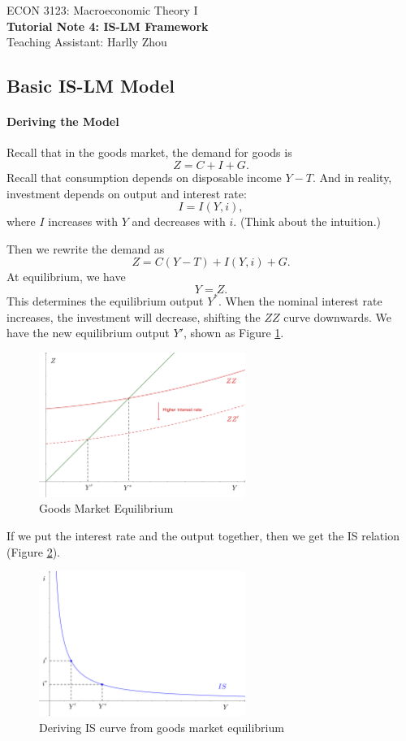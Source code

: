 \documentclass[12pt]{article}
\begin{document}
\begin{center}
    ECON 3123: Macroeconomic Theory I\\
    {\large \textbf{Tutorial Note 4: IS-LM Framework}}\\
    Teaching Assistant: Harlly Zhou
\end{center}

\subsection*{Basic IS-LM Model}
\paragraph{Deriving the Model}
Recall that in the goods market, the demand for goods is
\[ Z = C + I + G. \]
Recall that consumption depends on disposable income $Y-T$. And in reality, investment depends on output and interest rate:
\[ I = I (Y,i),\]
where $I$ increases with $Y$ and decreases with $i$. (Think about the intuition.)

Then we rewrite the demand as
\[ Z = C(Y-T) + I(Y,i) + G.\]
At equilibrium, we have
\[ Y = Z.\]
This determines the equilibrium output $Y^*$. When the nominal interest rate increases, the investment will decrease, shifting the $ZZ$ curve downwards. We have the new equilibrium output $Y'$, shown as Figure \ref{fig:is_01}.

\begin{figure}[htp]
    \centering
    \includegraphics[width=0.6\textwidth]{is_01.png}
    \caption{Goods Market Equilibrium}
    \label{fig:is_01}
\end{figure}

If we put the interest rate and the output together, then we get the IS relation (Figure \ref{fig:is_02}).\

\begin{figure}[htp]
    \centering
    \includegraphics[width=0.6\textwidth]{is_02.png}
    \caption{Deriving IS curve from goods market equilibrium}
    \label{fig:is_02}
\end{figure}
\end{document}
